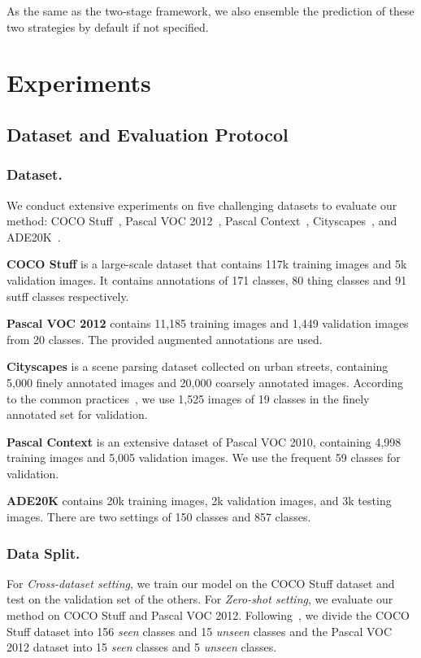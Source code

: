\documentclass[runningheads]{llncs}
\begin{document}
As the same as the two-stage framework, we also ensemble the prediction of these two strategies by default if not specified.

\section{Experiments}
\subsection{Dataset and Evaluation Protocol}
\subsubsection{Dataset.}
We conduct extensive experiments on five challenging datasets to evaluate our method: COCO Stuff~\cite{caesar2018coco}, Pascal VOC 2012~\cite{everingham2011pascal}, Pascal Context~\cite{mottaghi2014role}, Cityscapes~\cite{cordts2016cityscapes}, and ADE20K~\cite{zhou2017scene}. 


\noindent\textbf{COCO Stuff} is a large-scale dataset that contains 117k training images and 5k validation images. It contains annotations of 171 classes, 80 thing classes and 91 sutff classes respectively.


\noindent\textbf{Pascal VOC 2012} contains 11,185 training images and 1,449 validation images from 20 classes. The provided augmented annotations are used. 


\noindent\textbf{Cityscapes} is a scene parsing dataset collected on urban streets, containing 5,000 finely annotated images and 20,000 coarsely annotated images. According to the common practices~\cite{cordts2016cityscapes}, we use 1,525 images of 19 classes in the finely annotated set for validation.


\noindent\textbf{Pascal Context} is an extensive dataset of Pascal VOC 2010, containing 4,998 training images and 5,005 validation images. We use the frequent 59 classes for validation.


\noindent\textbf{ADE20K} contains 20k training images, 2k validation images, and 3k testing images. There are two settings of 150 classes and 857 classes.

\subsubsection{Data Split.} 
For \emph{Cross-dataset setting}, we train our model on the COCO Stuff dataset and test on the validation set of the others. 
For \emph{Zero-shot setting}, we evaluate our method on COCO Stuff and Pascal VOC 2012. Following~\cite{xian2019semantic}, we divide the COCO Stuff dataset into 156 \emph{seen} classes and 15 \emph{unseen} classes and the Pascal VOC 2012 dataset into 15 \emph{seen} classes and 5 \emph{unseen} classes. 
\end{document}
